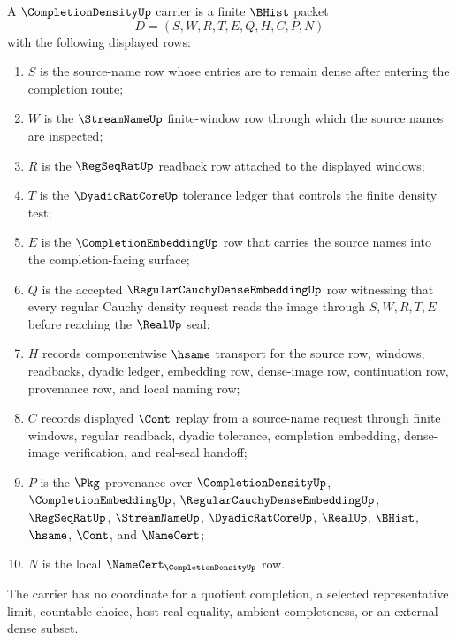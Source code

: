 \begin{definition}
\label{def:completion-density-carrier}
A $\CompletionDensityUp$ carrier is a finite $\BHist$ packet
$$
D=(S,W,R,T,E,Q,H,C,P,N)
$$
with the following displayed rows:
\begin{enumerate}
\item $S$ is the source-name row whose entries are to remain dense after entering the completion route;
\item $W$ is the $\StreamNameUp$ finite-window row through which the source names are inspected;
\item $R$ is the $\RegSeqRatUp$ readback row attached to the displayed windows;
\item $T$ is the $\DyadicRatCoreUp$ tolerance ledger that controls the finite density test;
\item $E$ is the $\CompletionEmbeddingUp$ row that carries the source names into the completion-facing surface;
\item $Q$ is the accepted $\RegularCauchyDenseEmbeddingUp$ row witnessing that every regular Cauchy density request reads the image through $S,W,R,T,E$ before reaching the $\RealUp$ seal;
\item $H$ records componentwise $\hsame$ transport for the source row, windows, readbacks, dyadic ledger, embedding row, dense-image row, continuation row, provenance row, and local naming row;
\item $C$ records displayed $\Cont$ replay from a source-name request through finite windows, regular readback, dyadic tolerance, completion embedding, dense-image verification, and real-seal handoff;
\item $P$ is the $\Pkg$ provenance over $\CompletionDensityUp$, $\CompletionEmbeddingUp$, $\RegularCauchyDenseEmbeddingUp$, $\RegSeqRatUp$, $\StreamNameUp$, $\DyadicRatCoreUp$, $\RealUp$, $\BHist$, $\hsame$, $\Cont$, and $\NameCert$;
\item $N$ is the local $\NameCert_{\CompletionDensityUp}$ row.
\end{enumerate}
The carrier has no coordinate for a quotient completion, a selected representative limit, countable choice, host real equality, ambient completeness, or an external dense subset.
\end{definition}

